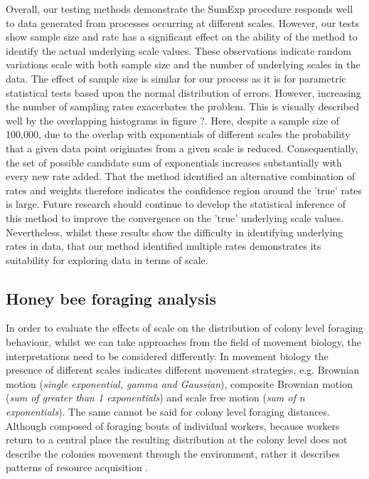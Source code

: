 \documentclass[11pt,usenames,dvipsnames]{article}
\begin{document}
Overall, our testing methods demonstrate the SumExp procedure responds well to data generated from processes occurring at different scales. However, our tests show sample size and rate has a significant effect on the ability of the method to identify the actual underlying scale values. These observations indicate random variations scale with both sample size and the number of underlying scales in the data. The effect of sample size is similar for our process as it is for parametric statistical tests based upon the normal distribution of errors. However, increasing the number of sampling rates exacerbates the problem. This is visually described well by the overlapping histograms in figure ?. Here, despite a sample size of 100,000, due to the overlap with exponentials of different scales the probability that a given data point originates from a given scale is reduced. Consequentially, the set of possible candidate sum of exponentials increases substantially with every new rate added. That the method identified an alternative combination of rates and weights therefore indicates the confidence region around the 'true' rates is large. Future research should continue to develop the statistical inference of this method to improve the convergence on the 'true' underlying scale values. Nevertheless, whilst these results show the difficulty in identifying underlying rates in data, that our method identified multiple rates demonstrates its suitability for exploring data in terms of scale.

\subsection{Honey bee foraging analysis}

In order to evaluate the effects of scale on the distribution of colony level foraging behaviour, whilst we can take approaches from the field of movement biology, the interpretations need to be considered differently. In movement biology the presence of different scales indicates different movement strategies, e.g. Brownian motion (\textit{single exponential, gamma and Gaussian}), composite Brownian motion (\textit{sum of greater than 1 exponentials}) and scale free motion (\textit{sum of n exponentials}). The same cannot be said for colony level foraging distances. Although composed of foraging bouts of individual workers, because workers return to a central place the resulting distribution at the colony level does not describe the colonies movement through the environment, rather it describes patterns of resource acquisition \citep{Visscher1982, Waddington1994, Couvillon2014, Couvillon2015}.
\end{document}
